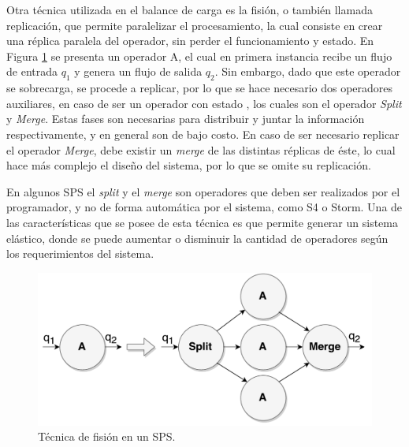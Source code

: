 
Otra técnica utilizada en el balance de carga es la fisión, o también llamada replicación, que permite paralelizar el procesamiento, la cual consiste en crear una réplica paralela del operador, sin perder el funcionamiento y estado. En Figura \ref{fig:fision} se presenta un operador A, el cual en primera instancia recibe un flujo de entrada $q_1$ y genera un flujo de salida $q_2$. Sin embargo, dado que este operador se sobrecarga, se procede a replicar, por lo que se hace necesario dos operadores auxiliares, \normalsize{en caso de ser un operador con estado} \citep{WuKWO12}, los cuales son el operador \textit{Split} y \textit{Merge}. Estas fases son necesarias para distribuir y juntar la información respectivamente, y en general son de bajo costo. En caso de ser necesario replicar el operador \textit{Merge}, debe existir un \textit{merge} de las distintas réplicas de éste, lo cual hace más complejo el diseño del sistema, por lo que se omite su replicación.

En algunos SPS el \textit{split} y el \textit{merge} son operadores que deben ser realizados por el programador, y no de forma automática por el sistema, como S4 o Storm. Una de las características que se posee de esta técnica es que permite generar un sistema elástico, donde se puede aumentar o disminuir la cantidad de operadores según los requerimientos del sistema.

\begin{figure}[!ht]
	\centering
	\includegraphics[scale=0.4]{images/Fision.pdf}
	\caption{Técnica de fisión en un SPS.}
	\label{fig:fision}
\end{figure}

